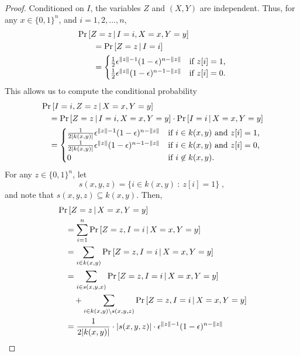 \begin{proof}
Conditioned on $I$, the variables $Z$ and $(X,Y)$ are independent. Thus,
for any $x \in \{0,1\}^n$, and $i = 1,2,\dots,n$,
\begin{align*}
& \Pr \left[Z = z \, \middle| \, I = i, X = x, Y = y \right] \\
& \qquad = \Pr \left[Z = z \, \middle| \, I = i \right] \\
& \qquad =
\begin{cases}
\frac{1}{2} \epsilon^{\left\| z \right\| - 1} (1 - \epsilon)^{n - \left\| z \right\|} & \text{if $z[i] = 1$,} \\
\frac{1}{2} \epsilon^{\left\| z \right\|} (1 - \epsilon)^{n-1 - \left\| z \right\|}& \text{if $z[i] = 0$.} \\
\end{cases}
\end{align*}
This allows us to compute the conditional probability
\begin{align*}
& \Pr \left[I = i, Z = z \, \middle| \, X = x, Y = y \right] \\
& \quad = \Pr \left[Z = z \, \middle| \, I = i, X = x, Y = y \right] \cdot \Pr \left[I = i \, \middle| \, X = x, Y = y \right] \\
& \quad =
\begin{cases}
\frac{1}{2|k(x,y)|} \epsilon^{\left\| z \right\| - 1} (1 - \epsilon)^{n - \left\| z \right\|} & \text{if $i \in k(x,y)$ and $z[i] = 1$,} \\
\frac{1}{2|k(x,y)|} \epsilon^{\left\| z \right\|} (1 - \epsilon)^{n - 1 - \left\| z \right\|} & \text{if $i \in k(x,y)$ and $z[i] = 0$,} \\
0 & \text{if $i \not \in k(x,y)$.} \\
\end{cases}
\end{align*}
For any $z \in \{0,1\}^n$, let
$$
s(x,y,z) = \{ i \in k(x,y) ~:~ z[i] = 1 \} \; ,
$$
and note that $s(x,y,z) \subseteq k(x,y)$.
Then,
\begin{align*}
& \Pr \left[Z = z \, \middle| \, X = x, Y = y \right] \\
& \quad = \sum_{i=1}^n \Pr \left[Z = z, I = i \, \middle| \, X = x, Y = y \right] \\
& \quad = \sum_{i \in k(x,y)} \Pr \left[Z = z, I = i \, \middle| \, X = x, Y = y \right] \\
& \quad = \sum_{i \in s(x,y,x)} \Pr \left[Z = z, I = i \, \middle| \, X = x, Y = y \right] \\
& \qquad + \sum_{i \in k(x,y) \setminus s(x,y,z)} \Pr \left[Z = z, I = i \, \middle| \, X = x, Y = y \right] \\
& \quad = \frac{1}{2|k(x,y)|} \cdot |s(x,y,z)| \cdot \epsilon^{\norm{z} - 1} (1 - \epsilon)^{n - \norm{z}} \\

\end{align*}
\end{proof}
